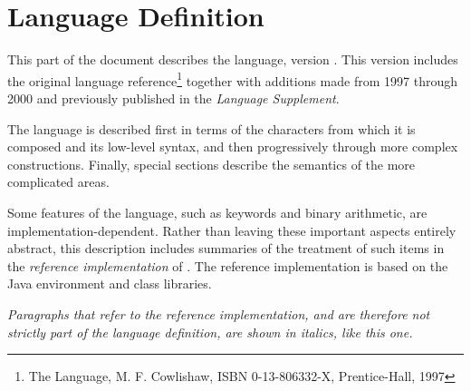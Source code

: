 \chapter{\nr{} Language Definition}\label{refpart3}
 
This part of the document describes the \nr{} language, version .
This version includes the original \nr{} language reference\footnote{
The \nr{} Language, M. F. Cowlishaw,
ISBN 0-13-806332-X, Prentice-Hall, 1997
}
together with additions made from 1997 through 2000 and previously
published in the \emph{\nr{} Language Supplement}.
 
The language is described first in terms of the characters from which it
is composed and its low-level syntax, and then progressively through
more complex constructions.
Finally, special sections describe the semantics of the more
complicated areas.
 
Some features of the language, such as  keywords and
binary arithmetic, are implementation-dependent.  Rather than leaving
these important aspects entirely abstract, this description includes
summaries of the treatment of such items in the \emph{reference
implementation} of \nr{}.  The reference implementation is based
on the Java environment and class libraries.
 
\emph{Paragraphs that refer to the reference implementation,
and are therefore not strictly part of the language definition, are
shown in italics, like this one.}
